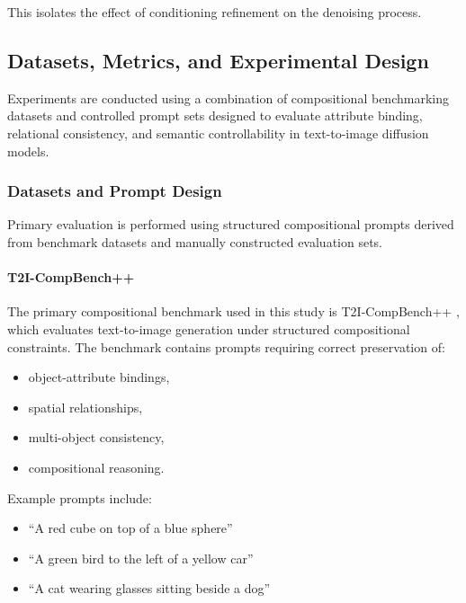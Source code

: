 \documentclass[a4paper,twoside,12pt]{report}
\begin{document}
This isolates the effect of conditioning refinement on the denoising process.






\subsection{Datasets, Metrics, and Experimental Design}

Experiments are conducted using a combination of compositional benchmarking datasets and controlled prompt sets designed to evaluate attribute binding, relational consistency, and semantic controllability in text-to-image diffusion models.

\subsubsection{Datasets and Prompt Design}

Primary evaluation is performed using structured compositional prompts derived from benchmark datasets and manually constructed evaluation sets.

\paragraph{T2I-CompBench++}

The primary compositional benchmark used in this study is T2I-CompBench++ \citep{huang2023t2icompbench}, which evaluates text-to-image generation under structured compositional constraints. The benchmark contains prompts requiring correct preservation of:

\begin{itemize}
    \item object-attribute bindings,
    \item spatial relationships,
    \item multi-object consistency,
    \item compositional reasoning.
\end{itemize}

Example prompts include:

\begin{itemize}
    \item ``A red cube on top of a blue sphere''
    \item ``A green bird to the left of a yellow car''
    \item ``A cat wearing glasses sitting beside a dog''
\end{itemize}
\end{document}
